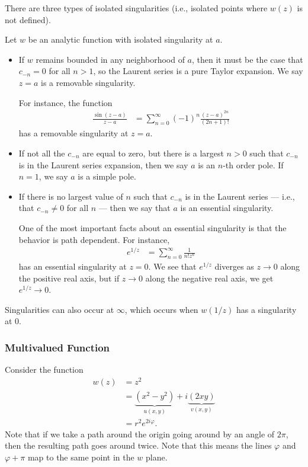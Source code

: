 \documentclass[10pt]{mypackage}
\begin{document}
There are three types of isolated singularities (i.e., isolated points where $w(z)$ is not defined).
\begin{definition}
  Let $w$ be an analytic function with isolated singularity at $a$.
  \begin{itemize}
    \item If $w$ remains bounded in any neighborhood of $a$, then it must be the case that $c_{-n} = 0$ for all $n > 1$, so the Laurent series is a pure Taylor expansion. We say $z = a$ is a removable singularity.\newline

      For instance, the function
      \begin{align*}
        \frac{\sin\left( z-a \right)}{z-a} &= \sum_{n=0}^{\infty}\left( -1 \right)^n \frac{\left( z-a \right)^{2n}}{\left( 2n+1 \right)!}
      \end{align*}
      has a removable singularity at $z=a$.
    \item If not all the $c_{-n}$ are equal to zero, but there is a largest $n > 0$ such that $c_{-n}$ is in the Laurent series expansion, then we say $a$ is an $n$-th order pole. If $n = 1$, we say $a$ is a simple pole.
    \item If there is no largest value of $n$ such that $c_{-n}$ is in the Laurent series --- i.e., that $c_{-n}\neq 0$ for all $n$ --- then we say that $a$ is an essential singularity.\newline

      One of the most important facts about an essential singularity is that the behavior is path dependent. For instance,
      \begin{align*}
        e^{1/z} &= \sum_{n=0}^{\infty}\frac{1}{n!z^n}
      \end{align*}
      has an essential singularity at $z = 0$. We see that $e^{1/z}$ diverges as $z \rightarrow 0$ along the positive real axis, but if $z\to 0$ along the negative real axis, we get $e^{1/z}\to 0$.
  \end{itemize}
  Singularities can also occur at $\infty$, which occurs when $w(1/z)$ has a singularity at $0$.
\end{definition}
\subsubsection{Multivalued Function}%
Consider the function
\begin{align*}
  w(z) &= z^2\\
       &= \underbrace{\left( x^2 - y^2 \right)}_{u(x,y)} + i\underbrace{\left( 2xy \right)}_{v(x,y)}\\
       &= r^2e^{2i\varphi}.
\end{align*}
Note that if we take a path around the origin going around by an angle of $2\pi$, then the resulting path goes around twice. Note that this means the lines $\varphi$ and $\varphi + \pi$ map to the same point in the $w$ plane.\newline
\end{document}
